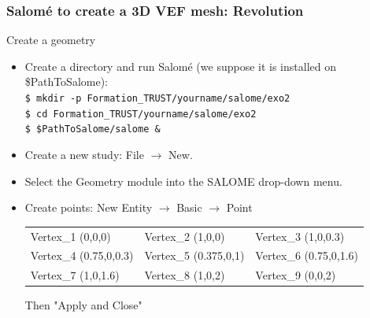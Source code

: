 \documentclass[10pt, hyperref={unicode=true,pdfusetitle, bookmarks=true,bookmarksnumbered=false,bookmarksopen=false, breaklinks=false,pdfborder={0 0l 1},backref=true,colorlinks=true,linkcolor=darkblue,pageanchor}]{beamer}
\begin{document}
\begin{frame}
\frametitle{Salom\'e to create a 3D VEF mesh: Revolution}
\begin{block}{Create a geometry}

\begin{itemize}
\item Create a directory and run Salom\'e (we suppose it is installed on \$PathToSalome):\\
\texttt{\$ mkdir -p Formation\_TRUST/yourname/salome/exo2} \\
\texttt{\$ cd Formation\_TRUST/yourname/salome/exo2} \\
\texttt{\$ \$PathToSalome/salome \&} 

\item Create a new study: File $\rightarrow$ New.

\item Select the Geometry module into the SALOME drop-down menu.

\item Create points: New Entity $\rightarrow$ Basic $\rightarrow$ Point\\
\begin{tabular}{lll}
Vertex\_1 (0,0,0)       &   Vertex\_2 (1,0,0)       &   Vertex\_3 (1,0,0.3) \tabularnewline
Vertex\_4 (0.75,0,0.3)  &   Vertex\_5 (0.375,0,1)   &   Vertex\_6 (0.75,0,1.6) \tabularnewline
Vertex\_7 (1,0,1.6)     &   Vertex\_8 (1,0,2)       &   Vertex\_9 (0,0,2) \tabularnewline
\end{tabular}

Then "Apply and Close"

\end{itemize}

\end{block}
\end{frame}
\end{document}
